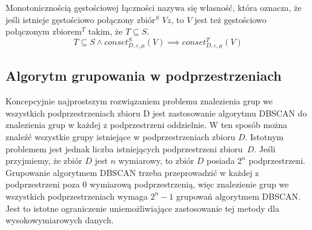 \newline
Monotonicznością gęstościowej łączności nazywa się własność, która oznacza, że jeśli istnieje gęstościowo połączony zbiór$^S$ $ V z$, to $ V $ jest też gęstościowo połączonym zbiorem$^T$ takim, że $ T \subseteq S $.
\begin{equation}
	T\subseteq S \land conset^S_{D,\varepsilon,\mu}(V) \implies conset^T_{D,\varepsilon,\mu}(V)
\end{equation}

\subsection{Algorytm grupowania w podprzestrzeniach}
Koncepcyjnie najprostszym rozwiązaniem problemu znalezienia grup we wszystkich podprzestrzeniach zbioru D jest zastosowanie algorytmu DBSCAN do znalezienia grup w każdej z podprzestrzeni oddzielnie. W ten sposób można znaleźć wszystkie grupy istniejące w podprzestrzeniach zbioru $ D $. Istotnym problemem jest jednak liczba istniejących podprzestrzeni \mbox{zbioru $ D $}. Jeśli przyjmiemy, że zbiór $ D $ jest $ n $ wymiarowy, to zbiór $ D $ posiada $ 2^n $ podprzestrzeni. Grupowanie algorytmem DBSCAN trzeba przeprowadzić w każdej z podprzestrzeni poza $ 0 $ wymiarową podprzestrzenią, więc znalezienie grup we wszystkich podprzestrzeniach wymaga $ 2^n-1 $ grupowań algorytmem DBSCAN. Jest to istotne ograniczenie uniemożliwiające zastosowanie tej metody dla wysokowymiarowych danych.

